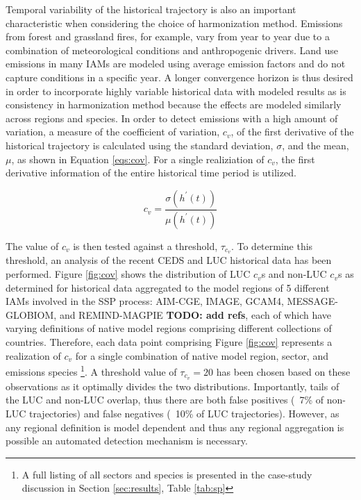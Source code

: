 \documentclass[review]{elsarticle}
\newcommand{\TODO}[1]{\textbf{TODO: #1}}
\begin{document}
Temporal variability of the historical trajectory is also an important
characteristic when considering the choice of harmonization method.  Emissions
from forest and grassland fires, for example, vary from year to year due to a
combination of meteorological conditions and anthropogenic drivers. Land use
emissions in many IAMs are modeled using average emission factors and do not
capture conditions in a specific year. A longer convergence horizon is thus
desired in order to incorporate highly variable historical data with modeled
results as is consistency in harmonization method because the effects are
modeled similarly across regions and species. In order to detect emissions with
a high amount of variation, a measure of the coefficient of variation, $c_v$, of
the first derivative of the historical trajectory is calculated using the
standard deviation, $\sigma$, and the mean, $\mu$, as shown in Equation
\ref{eqs:cov}. For a single realiziation of $c_v$, the first derivative
information of the entire historical time period is utilized.

\begin{equation}\label{eqs:cov}
    c_v =  \frac{\sigma(h^{\prime}(t))}{\mu(h^{\prime}(t))}
\end{equation}

The value of $c_v$ is then tested against a threshold, $\tau_{c_v}$. To
determine this threshold, an analysis of the recent CEDS and LUC historical data
has been performed. Figure \ref{fig:cov} shows the distribution of LUC $c_v$s
and non-LUC $c_v$s as determined for historical data aggregated to the model
regions of 5 different IAMs involved in the SSP process: AIM-CGE, IMAGE, GCAM4,
MESSAGE-GLOBIOM, and REMIND-MAGPIE \TODO{add refs}, each of which have varying
definitions of native model regions comprising different collections of
countries. Therefore, each data point comprising Figure \ref{fig:cov} represents
a realization of $c_v$ for a single combination of native model region, sector,
and emissions species \footnote{A full listing of all sectors and species is
  presented in the case-study discussion in Section \ref{sec:results}, Table
  \ref{tab:sp}}. A threshold value of $\tau_{c_v} = 20$ has been chosen based on
these observations as it optimally divides the two distributions. Importantly,
tails of the LUC and non-LUC overlap, thus there are both false positives (~7\%
of non-LUC trajectories) and false negatives (~10\% of LUC
trajectories). However, as any regional definition is model dependent and thus
any regional aggregation is possible an automated detection mechanism is
necessary.
\end{document}
